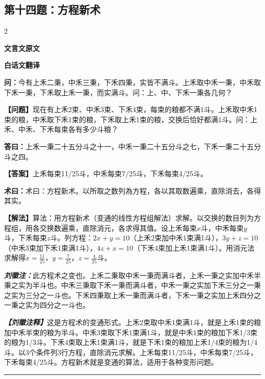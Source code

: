 \documentclass[10pt,a4paper]{article}
\newcommand{\wen}[1]{\textbf{\color{problemcolor}问：}#1\par}
\newcommand{\da}[1]{\textbf{答曰：}#1\par}
\newcommand{\shu}[1]{\textbf{术曰：}#1\par}
\newcommand{\liuhui}[1]{{\color{commentarycolor}\textit{\textbf{刘徽注：}}#1\par}}
\newcommand{\classicalheader}[1]{{\centering\large\bfseries\color{classicalcolor} #1\par\vspace{0.5em}}}
\newcommand{\wenmodern}[1]{\textbf{\color{moderncolor}【问题】}#1\par}
\newcommand{\damodern}[1]{\textbf{【答案】}#1\par}
\newcommand{\shumodern}[1]{\textbf{【解法】}#1\par}
\newcommand{\liuhuimodern}[1]{{\color{commentarycolor}\textit{\textbf{【刘徽注释】}}#1\par}}
\newcommand{\modernheader}[1]{{\centering\large\bfseries\color{moderncolor} #1\par\vspace{0.5em}}}
\newcommand{\problemsec}[1]{\subsection*{#1}}
\begin{document}
\problemsec{第十四题：方程新术}
\begin{paracol}{2}
\classicalheader{文言文原文}
\switchcolumn
\modernheader{白话文翻译}
\switchcolumn*

\wen{今有上禾二秉，中禾三秉，下禾四秉，实皆不满斗。上禾取中禾一秉，中禾取下禾一秉，下禾取上禾一秉，而实满斗。问：上、中、下禾一秉各几何？}

\switchcolumn

\wenmodern{现在有上禾2束、中禾3束、下禾4束，每束的粮都不满1斗。上禾取中禾1束的粮，中禾取下禾1束的粮，下禾取上禾1束的粮，交换后恰好都满1斗。问：上禾、中禾、下禾每束各有多少斗粮？}

\switchcolumn*

\da{上禾一秉二十五分斗之十一，中禾一秉二十五分斗之七，下禾一秉二十五分斗之四。}

\switchcolumn

\damodern{上禾每束11/25斗，中禾每束7/25斗，下禾每束4/25斗。}

\switchcolumn*

\shu{术曰：方程新术。以所取之数列為方程，各以其取数遍乘，直除消去，各得其实。}

\switchcolumn

\shumodern{算法：用方程新术（变通的线性方程组解法）求解。以交换的数目列为方程组，用各交换数遍乘，直除消元，各求得其值。设上禾每束$x$斗，中禾每束$y$斗，下禾每束$z$斗。列方程：$2x+y=10$（上禾2束加中禾1束满1斗），$3y+z=10$（中禾3束加下禾1束满1斗），$4z+x=10$（下禾4束加上禾1束满1斗）。用消元法求解得$x=\frac{11}{25}$，$y=\frac{7}{25}$，$z=\frac{4}{25}$斗。}

\switchcolumn*

\liuhui{此方程术之变也。上禾二秉取中禾一秉而满斗者，上禾一秉之实加中禾半秉之实为半斗也。中禾三秉取下禾一秉而满斗者，中禾一秉之实加下禾三分之一秉之实为三分之一斗也。下禾四秉取上禾一秉而满斗者，下禾一秉之实加上禾四分之一秉之实为四分之一斗也。}

\switchcolumn

\liuhuimodern{这是方程术的变通形式。上禾2束取中禾1束满1斗，就是上禾1束的粮加中禾半束的粮为半斗。中禾3束取下禾1束满1斗，就是中禾1束的粮加下禾1/3束的粮为1/3斗。下禾4束取上禾1束满1斗，就是下禾1束的粮加上禾1/4束的粮为1/4斗。以3个条件列3行方程，直除消元求解。上禾每束11/25斗，中禾每束7/25斗，下禾每束4/25斗。方程新术就是变通的算法，适用于各种变形问题。}

\end{paracol}

\vspace{0.3cm}
\hrule
\vspace{0.3cm}
\end{document}
